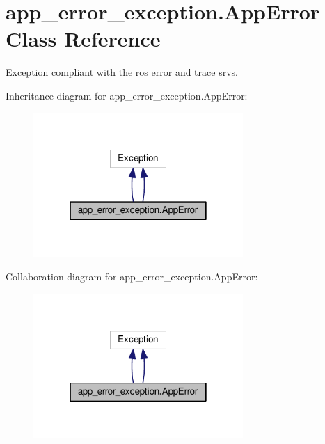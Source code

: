 \hypertarget{classapp__error__exception_1_1AppError}{\section{app\-\_\-error\-\_\-exception.\-App\-Error Class Reference}
\label{classapp__error__exception_1_1AppError}
}


Exception compliant with the ros error and trace srvs.  




Inheritance diagram for app\-\_\-error\-\_\-exception.\-App\-Error\-:
\nopagebreak
\begin{figure}[H]
\begin{center}
\leavevmode
\includegraphics[width=226pt]{classapp__error__exception_1_1AppError__inherit__graph}
\end{center}
\end{figure}


Collaboration diagram for app\-\_\-error\-\_\-exception.\-App\-Error\-:
\nopagebreak
\begin{figure}[H]
\begin{center}
\leavevmode
\includegraphics[width=226pt]{classapp__error__exception_1_1AppError__coll__graph}
\end{center}
\end{figure}
